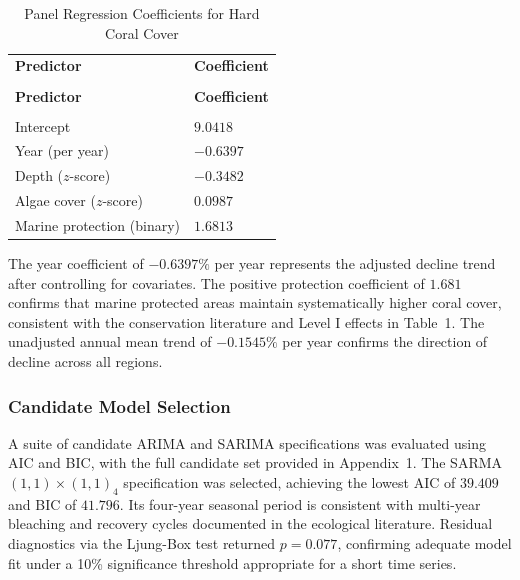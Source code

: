 \documentclass[10pt,letterpaper]{article}
\begin{document}
\begingroup
{}
\renewcommand{\arraystretch}{1.1}
\begin{xltabular}{\textwidth}{>{\centering\arraybackslash}p{6.5cm} 
                >{\centering\arraybackslash}X}
\caption{Panel Regression Coefficients for Hard Coral Cover}
\label{tab:panel-regression}\\
\toprule
{}\textbf{Predictor} & \textbf{Coefficient} \\
\midrule
\endfirsthead
{} \\[4pt]
\toprule
{}\textbf{Predictor} & \textbf{Coefficient} \\
\midrule
\endhead
\midrule
{} \\
\endfoot
\bottomrule
\endlastfoot
Intercept                  & $9.0418$  \\
Year (per year)            & $-0.6397$ \\
Depth ($z$-score)          & $-0.3482$ \\
Algae cover ($z$-score)    & $0.0987$  \\
Marine protection (binary) & $1.6813$  \\
\end{xltabular}
\endgroup

The year coefficient of $-0.6397\%$ per year represents the adjusted decline trend after controlling for covariates. The positive protection coefficient of $1.681$ confirms that marine protected areas maintain systematically higher coral cover, consistent with the conservation literature and Level I effects in Table~1. The unadjusted annual mean trend of $-0.1545\%$ per year confirms the direction of decline across all regions.

\subsubsection{Candidate Model Selection}

A suite of candidate ARIMA and SARIMA specifications was evaluated using AIC and BIC, with the full candidate set provided in Appendix~1. The SARMA$(1,1)\times(1,1)_4$ specification was selected, achieving the lowest AIC of $39.409$ and BIC of $41.796$. Its four-year seasonal period is consistent with multi-year bleaching and recovery cycles documented in the ecological literature. Residual diagnostics via the Ljung-Box test returned $p = 0.077$, confirming adequate model fit under a 10\% significance threshold appropriate for a short time series.
\end{document}
